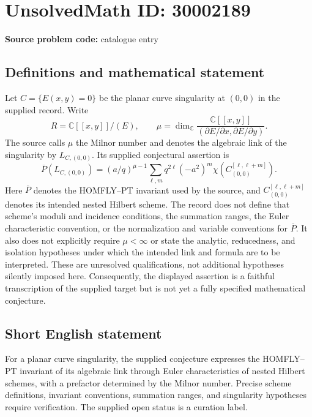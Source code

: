 \documentclass[11pt]{article}
\newcommand{\C}{\mathbb{C}}
\begin{document}
\section*{UnsolvedMath ID: 30002189}
\textbf{Source problem code:} catalogue entry
\subsection{Definitions and mathematical statement}
Let \(C=\{E(x,y)=0\}\) be the planar curve singularity at \((0,0)\) in the supplied record. Write
\[
R=\C[[x,y]]/(E),\qquad
\mu=\dim_{\C}\frac{\C[[x,y]]}{(\partial E/\partial x,\partial E/\partial y)}.
\]
The source calls \(\mu\) the Milnor number and denotes the algebraic link of the singularity by \(L_{C,(0,0)}\). Its supplied conjectural assertion is
\[
\overline P(L_{C,(0,0)})
=
(a/q)^{\mu-1}
\sum_{\ell,m}q^{2\ell}(-a^2)^m
\chi\!\left(C_{(0,0)}^{[\ell,\ell+m]}\right).
\]
Here \(\overline P\) denotes the HOMFLY--PT invariant used by the source, and \(C_{(0,0)}^{[\ell,\ell+m]}\) denotes its intended nested Hilbert scheme. The record does not define that scheme's moduli and incidence conditions, the summation ranges, the Euler characteristic convention, or the normalization and variable conventions for \(\overline P\). It also does not explicitly require \(\mu<\infty\) or state the analytic, reducedness, and isolation hypotheses under which the intended link and formula are to be interpreted. These are unresolved qualifications, not additional hypotheses silently imposed here. Consequently, the displayed assertion is a faithful transcription of the supplied target but is not yet a fully specified mathematical conjecture.
\subsection{Short English statement}
For a planar curve singularity, the supplied conjecture expresses the HOMFLY--PT invariant of its algebraic link through Euler characteristics of nested Hilbert schemes, with a prefactor determined by the Milnor number. Precise scheme definitions, invariant conventions, summation ranges, and singularity hypotheses require verification. The supplied open status is a curation label.
\end{document}
